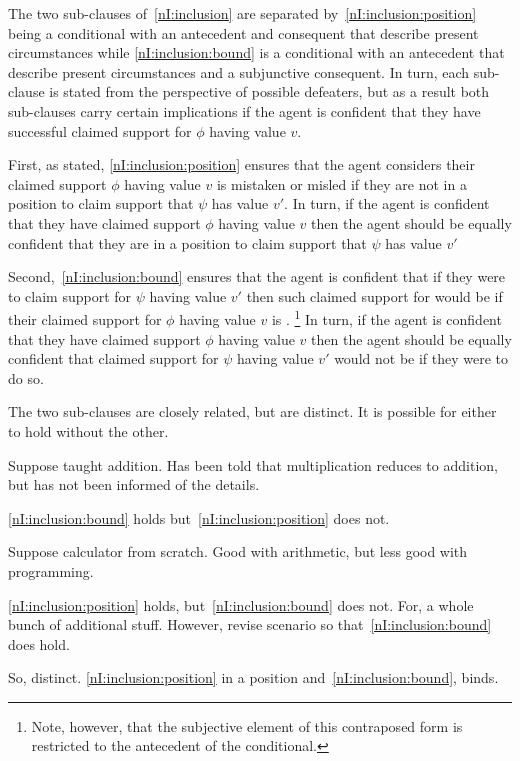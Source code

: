 \begin{note}
  The two sub-clauses of~\ref{nI:inclusion} are separated by~\ref{nI:inclusion:position} being a conditional with an antecedent and consequent that describe present circumstances while \ref{nI:inclusion:bound} is a conditional with an antecedent that describe present circumstances and a subjunctive consequent.
  In turn, each sub-clause is stated from the perspective of possible defeaters, but as a result both sub-clauses carry certain implications if the agent is confident that they have successful claimed support for \(\phi\) having value \(v\).

  First, as stated, \ref{nI:inclusion:position} ensures that the agent considers their claimed support \(\phi\) having value \(v\) is mistaken or misled if they are not in a position to claim support that \(\psi\) has value \(v'\).
  In turn, if the agent is confident that they have claimed support \(\phi\) having value \(v\) then the agent should be equally confident that they are in a position to claim support that \(\psi\) has value \(v'\)

  Second,~\ref{nI:inclusion:bound} ensures that the agent is confident that if they were to claim support for \(\psi\) having value \(v'\) then such claimed support for would be \mom{} if their claimed support for \(\phi\) having value \(v\) is \mom{}.\nolinebreak
  \footnote{
    Note, however, that the subjective element of this contraposed form is restricted to the antecedent of the conditional.
  }
  In turn, if the agent is confident that they have claimed support \(\phi\) having value \(v\) then the agent should be equally confident that claimed support for \(\psi\) having value \(v'\) would not be \mom{} if they were to do so.

  The two sub-clauses are closely related, but are distinct.
  It is possible for either to hold without the other.

  \begin{illustration}
    Suppose taught addition.
    Has been told that multiplication reduces to addition, but has not been informed of the details.
  \end{illustration}
  \ref{nI:inclusion:bound} holds but~\ref{nI:inclusion:position} does not.

  \begin{illustration}
    Suppose calculator from scratch.
    Good with arithmetic, but less good with programming.
  \end{illustration}
  \ref{nI:inclusion:position} holds, but~\ref{nI:inclusion:bound} does not.
  For, a whole bunch of additional stuff.
  However, revise scenario so that~\ref{nI:inclusion:bound} does hold.

  So, distinct.
  \ref{nI:inclusion:position} in a position and~\ref{nI:inclusion:bound}, binds.
\end{note}

